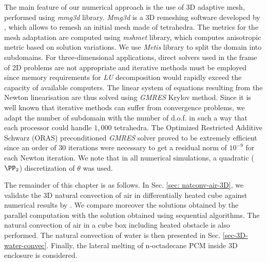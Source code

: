The main feature of our numerical approach is the use of 3D adaptive mesh, performed using \textit{mmg3d} library.
\textit{Mmg3d} is a 3D remeshing software developed by \cite{dobrzynski:hal-00681813}, which allows to remesh an initial mesh made of tetrahedra.
The metrics for the mesh adaptation are computed using \textit{mshmet} library, which computes anisotropic metric based on solution variations. 
We use \textit{Metis} library to split the domain into subdomains.
For three-dimensional applications, direct solvers used in the frame of 2D problems are not appropriate and iterative methods must be employed since memory requirements for \textit{LU} decomposition would rapidly exceed the capacity of available computers.
The linear system of equations resulting from the Newton linearisation are thus solved using \textit{GMRES} Krylov method.
Since it is well known that iterative methods can suffer from convergence problems, we adapt the number of subdomain with the number of d.o.f. in such a way that each processor could handle $1,000$ tetrahedra.
The Optimized Restricted Additive Schwarz (ORAS) preconditioned \textit{GMRES} solver proved to be extremely efficient since an order of 30 iterations were necessary to get a residual norm of $10^{-9}$ for each Newton iteration.
We note that in all numerical simulations, a quadratic ($\PP_2$) discretization of $\theta$ was used.

The remainder of this chapter is as follows.
In Sec. \ref{sec: natconv-air-3D}, we validate the 3D natural convection of air in differentially heated cube against numerical results by \cite{Wakashima-2004}.
We compare moreover the solutions obtained by the parallel computation with the solution obtained using sequential algorithms.
The natural convection of air in a cube box including heated obstacle is also performed.
The natural convection of water is then presented in Sec. \ref{sec-3D-water-convec}.
Finally, the lateral melting of n-octadecane PCM inside 3D enclosure is considered.


